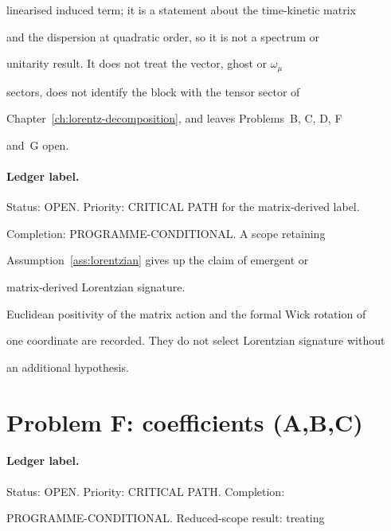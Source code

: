 linearised induced term; it is a statement about the time-kinetic matrix

and the dispersion at quadratic order, so it is not a spectrum or

unitarity result.  It does not treat the vector, ghost or \(\omega_\mu\)

sectors, does not identify the block with the tensor sector of

Chapter~\ref{ch:lorentz-decomposition}, and leaves Problems~B, C, D, F

and~G open.





\paragraph{Ledger label.} \label{detail:sec-C-paragraphledgerlabel-20}

Status: OPEN. Priority: CRITICAL PATH for the matrix-derived label.

Completion: PROGRAMME-CONDITIONAL. A scope retaining

Assumption~\ref{ass:lorentzian} gives up the claim of emergent or

matrix-derived Lorentzian signature.



Euclidean positivity of the matrix action and the formal Wick rotation of

one coordinate are recorded. They do not select Lorentzian signature without

an additional hypothesis.







\section{Problem F: coefficients (A,B,C)}

\label{sec:detailed-Problem F: coefficients (A,B,C)}



\paragraph{Ledger label.} \label{detail:sec-F-paragraphledgerlabel-21}

Status: OPEN. Priority: CRITICAL PATH. Completion:

PROGRAMME-CONDITIONAL. Reduced-scope result: treating

